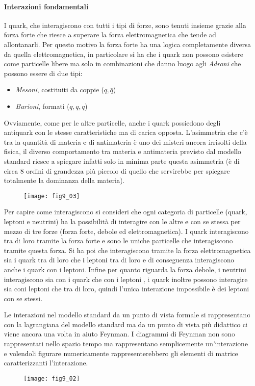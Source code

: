 \paragraph{Interazioni fondamentali}
I quark, che interagiscono con tutti i tipi di forze, sono tenuti insieme grazie alla forza forte che riesce a superare la forza elettromagnetica che tende ad allontanarli.
Per questo motivo la forza forte ha una logica completamente diversa da quella elettromagnetica, in particolare si ha che i quark non possono esistere come particelle libere ma solo in combinazioni che danno luogo agli \emph{Adroni} che possono essere di due tipi:
\begin{itemize}
\item \emph{Mesoni}, costituiti da coppie ($q, \bar{q}$)
\item \emph{Barioni}, formati ($q, q, q$)
\end{itemize}
Ovviamente, come per le altre particelle, anche i quark possiedono degli antiquark con le stesse caratteristiche ma di carica opposta.
L'asimmetria che c'è tra la quantità di materia e di antimateria è uno dei misteri ancora irrisolti della fisica, il diverso comportamento tra materia e antimateria previsto dal modello standard riesce a spiegare infatti solo in minima parte questa asimmetria (è di circa $8$ ordini di grandezza più piccolo di quello che servirebbe per spiegare totalmente la dominanza della materia).

\begin{figure}[h]
\centering
\texttt{[image: fig9\_03]}
\end{figure}
Per capire come interagiscono si consideri che ogni categoria di particelle (quark, leptoni e neutrini) ha la possibilità di interagire con le altre e con se stessa per mezzo di tre forze (forza forte, debole ed elettromagnetica).
I quark interagiscono tra di loro tramite la forza forte e sono le uniche particelle che interagiscono tramite questa forza.
Si ha poi che interagiscono tramite la forza elettromagnetica sia i quark tra di loro che i leptoni tra di loro e di conseguenza interagiscono anche i quark con i leptoni.
Infine per quanto riguarda la forza debole, i neutrini interagiscono sia con i quark che con i leptoni , i quark inoltre possono interagire sia coni leptoni che tra di loro, quindi l'unica interazione impossibile è dei leptoni con se stessi.

Le interazioni nel modello standard da un punto di vista formale si rappresentano con la lagrangiana del modello standard ma da un punto di vista più didattico ci viene ancora una volta in aiuto Feynman.
I diagrammi di Feynman non sono rappresentati nello spazio tempo ma rappresentano semplicemente un'interazione e volendoli figurare numericamente rappresenterebbero gli elementi di matrice caratterizzanti l'interazione.
\begin{figure}[h]
\centering
\texttt{[image: fig9\_02]}
\end{figure}

